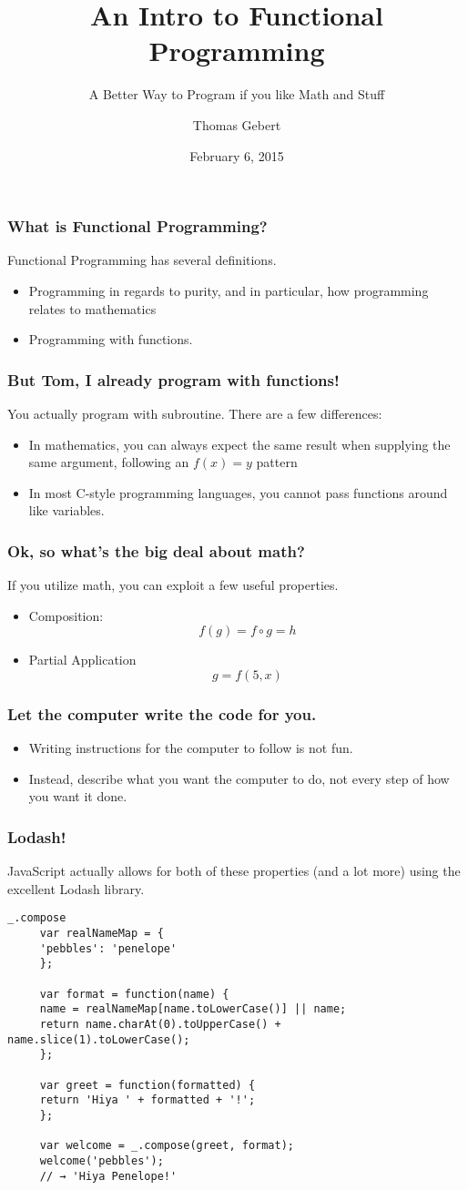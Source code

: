 \documentclass{beamer}
\title{An Intro to Functional Programming}
\subtitle{A Better Way to Program if you like Math and Stuff}
\author{Thomas Gebert}
\date{February 6, 2015}
\begin{document}
  \frame{\titlepage}
  \begin{frame}
  	\frametitle{What is Functional Programming?} 
  	Functional Programming has several definitions. 
	  \begin{itemize}
	    \item Programming in regards to purity, and in particular, how programming relates to mathematics
	    \item Programming with functions.
	  \end{itemize}
    
  \end{frame}
  \begin{frame}
  	\frametitle{But Tom, I already program with functions!}
  	You actually program with subroutine.  There are a few differences: 
  	\begin{itemize}
  		\item  In mathematics, you can always expect the same result when supplying the same argument, following an $ f(x) = y $ pattern
  		\item In most C-style programming languages, you cannot pass functions around like variables.
  	\end{itemize}
  \end{frame}
  \begin{frame}
  	\frametitle{Ok, so what's the big deal about math?}
  	If you utilize math, you can exploit a few useful properties. 
  	\begin{itemize}
  		\item Composition: $$ f\left(g\right) = f \circ g = h $$
	  	\item Partial Application $$g = f\left(5,x\right)$$
  	\end{itemize}
  \end{frame}
\begin{frame}
	\frametitle{Let the computer write the code for you.}
	\begin{itemize}
		\item Writing instructions for the computer to follow is not fun.
		\item Instead, describe what you want the computer to do, not every step of how you want it done. 
	\end{itemize}
\end{frame}
\begin{frame}[fragile]
	\frametitle{Lodash!}
	JavaScript actually allows for both of these properties (and a lot more) using the excellent Lodash library.
	\begin{lstlisting}[basicstyle=\tiny]
	 _.compose
	 var realNameMap = {
	 'pebbles': 'penelope'
	 };
	 
	 var format = function(name) {
	 name = realNameMap[name.toLowerCase()] || name;
	 return name.charAt(0).toUpperCase() + name.slice(1).toLowerCase();
	 };
	 
	 var greet = function(formatted) {
	 return 'Hiya ' + formatted + '!';
	 };
	 
	 var welcome = _.compose(greet, format);
	 welcome('pebbles');
	 // → 'Hiya Penelope!'
	\end{lstlisting}
    
\end{frame}
\end{document}
